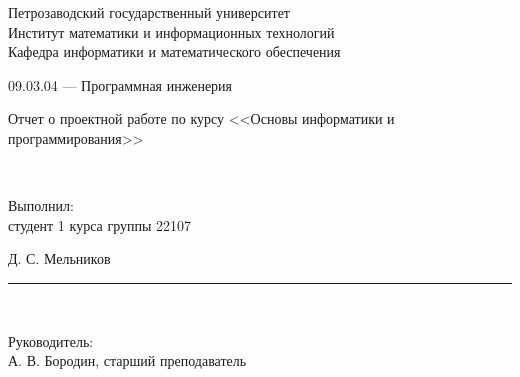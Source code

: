 \documentclass[a4paper,12pt]{article}
\newcommand{\myrule}[1]{\rule{#1}{0.4pt}}
\newcommand{\sign}[2][~]{{\small\myrule{#2}\\[-0.7em]\makebox[#2]{\it #1}}}
\renewcommand{\baselinestretch}{1.50}
\begin{document}

\thispagestyle{empty}
\begin{center}


\renewcommand{\baselinestretch}{1}
{\large
{\sc Петрозаводский государственный университет\\
Институт математики и информационных технологий\\
Кафедра информатики и математического обеспечения
}
}

\end{center}


\begin{center}
%
%
09.03.04 --- Программная инженерия \\
\end{center}

\vfill

\begin{center}
{\normalsize 
	Отчет о проектной работе по курсу <<Основы информатики и программирования>>}

\medskip

	{\Large {}} \\
\end{center}

\medskip

\begin{flushright}
\parbox{11cm}{%
\renewcommand{\baselinestretch}{1.2}
\normalsize
	Выполнил:\\
студент 1 курса группы 22107
\begin{flushright}
	Д. С. Мельников \sign[подпись]{4cm}
\end{flushright}

Руководитель:\\
А. В. Бородин, старший преподаватель

}
\end{flushright}
\end{document}
